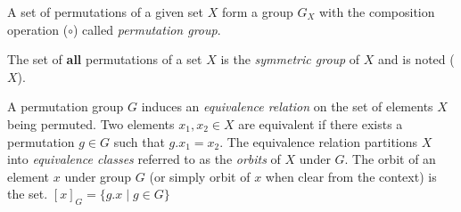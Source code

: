 \begin{definition}
 A set of permutations of a given set $X$ form a group $G_X$ with the composition operation ($\circ$) called \emph{permutation group}.
\end{definition}
\begin{definition}
The set of \textbf{all} permutations of a set $X$ is the \emph{symmetric group} of $X$ and is noted \Group($X$).
\end{definition}
%
A permutation group $G$ induces an \emph{equivalence relation} on the set of elements $X$ being
permuted. Two elements $x_1, x_2 \in X$ are equivalent if there exists a permutation $g \in G$ such that
$g.x_1 = x_2$. The equivalence relation partitions $X$ into \emph{equivalence classes} referred to
as the \emph{orbits} of $X$ under $G$. The orbit of an element $x$ under group $G$ (or simply orbit of $x$ when clear
from the context) is the set. $[x]_G = \{g.x \mid g \in G\}$
